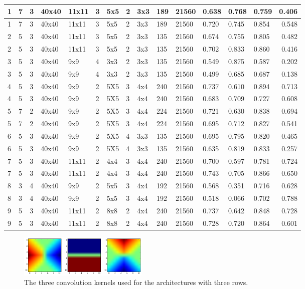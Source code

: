\documentclass[a4paper,onecolumn]{report}
\begin{document}
\begin{appendices}
\begin{tiny}
\begin{center}
\begin{tabular}{| l |p{0.5cm} |p{0.5cm} |p{0.5cm} |p{0.75cm} |p{0.7cm} |p{0.7cm} |p{0.75cm} |p{0.75cm} |p{0.75cm} |p{0.5cm} |p{0.8cm} |p{0.8cm} |p{0.8cm} |r | }
			1&	7&	3&	40x40&	11x11& 	3&	5x5&	2&	3x3&	189&	21560&	0.638&	0.768&	0.759&	0.406 \\ \hline
			1&	7&	3&	40x40&	11x11&	3&	5x5&	2&	3x3&	189&	21560&	0.720&	0.745&	0.854&	0.548\\ \hline
			2&	5&	3&	40x40&	11x11& 	3&	5x5&	2&	3x3&	135&	21560&	0.674&	0.755&	0.805&	0.482\\ \hline
			2&	5&	3&	40x40&	11x11& 	3&	5x5&	2&	3x3&	135&	21560&	0.702&	0.833&	0.860&	0.416\\ \hline
			3&	5&	3&	40x40&	9x9&	4&	3x3&	2&	3x3&	135&	21560&	0.549&	0.875&	0.587&	0.202\\ \hline
			3&	5&	3&	40x40&	9x9&	4&	3x3&	2&	3x3&	135&	21560&	0.499&	0.685&	0.687&	0.138\\ \hline
			4&	5&	3&	40x40&	9x9&	2&	5X5&	3&	4x4&	240&	21560&	0.737&	0.610&	0.894&	0.713\\ \hline
			4&	5&	3&	40x40&	9x9&	2&	5X5&	3&	4x4&	240&	21560&	0.683&	0.709&	0.727&	0.608\\ \hline
			5&	7&	2&	40x40&	9x9&	2&	5X5&	3&	4x4&	224&	21560&	0.721&	0.630&	0.838&	0.694\\ \hline
			5&	7&	2&	40x40&	9x9&	2&	5X5&	3&	4x4&	224&	21560&	0.695&	0.712&	0.827&	0.541\\ \hline
			6&	5&	3&	40x40&	9x9&	2&	5X5&	4&	3x3&	135&	21560&	0.695&	0.795&	0.820&	0.465\\ \hline
			6&	5&	3&	40x40&	9x9&	2&	5X5&	4&	3x3&	135&	21560&	0.635&	0.819&	0.833&	0.257\\ \hline
			7&	5&	3&	40x40&	11x11& 	2&	4x4&	3&	4x4&	240&	21560&	0.700&	0.597&	0.781&	0.724\\ \hline
			7&	5&	3&	40x40&	11x11& 	2&	4x4&	3&	4x4&	240&	21560&	0.743&	0.705&	0.866&	0.650\\ \hline
			8&	3&	4&	40x40&	9x9&	2&	5x5&	3&	4x4&	192&	21560&	0.568&	0.351&	0.716&	0.628\\ \hline
			8&	3&	4&	40x40&	9x9&	2&	5x5&	3&	4x4&	192&	21560&	0.518&	0.066&	0.702&	0.788\\ \hline
			9&	5&	3&	40x40&	11x11& 	2&	8x8&	2&	4x4&	240&	21560&	0.737&	0.642&	0.848&	0.728\\ \hline
			9&	5&	3&	40x40&	11x11& 	2&	8x8&	2&	4x4&	240&	21560&	0.728&	0.720&	0.864&	0.601 \\ \hline
			
			
		\end{tabular}
	\end{center}
\end{tiny}	


\begin{figure}[h!]
	\centering
	\includegraphics[width=0.3\textwidth]{./images/3filters.jpg}
	\caption{The three convolution kernels used for the architectures with three rows.}
	\label{fig:3filters}
\end{figure}


\end{appendices}
\end{document}

